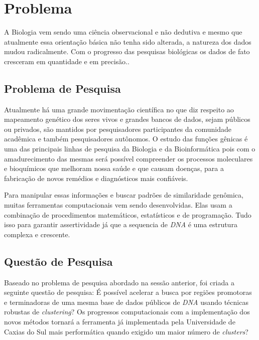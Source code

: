 \chapter{Problema}
\label{cap:PROBLEMA}

A Biologia vem sendo uma ciência observacional e não dedutiva e mesmo que atualmente essa orientação básica não tenha sido alterada, a natureza dos dados mudou radicalmente. Com o progresso das pesquisas biológicas os dados de fato cresceram em quantidade e em precisão.\cite{lesk2005introduction}.


\section{Problema de Pesquisa}

Atualmente há uma grande movimentação científica no que diz respeito ao mapeamento genético dos seres vivos e grandes bancos de dados, sejam públicos ou privados, são mantidos por pesquisadores participantes da comunidade acadêmica e também pesquisadores autônomos. O estudo das funções gênicas é uma das principais linhas de pesquisa da Biologia e da Bioinformática pois com o amadurecimento das mesmas será possível compreender os processos moleculares e bioquímicos que melhoram nossa saúde e que causam doenças, para a fabricação de novos remédios e diagnósticos mais confiáveis\cite{Murali2006}. 

Para manipular essas informações e buscar padrões de similaridade genômica, muitas ferramentas computacionais vem sendo desenvolvidas. Elas usam  a combinação de procedimentos matemáticos, estatísticos e de programação. Tudo isso para garantir assertividade já que a sequencia de \textit{DNA} é uma estrutura complexa e crescente.


\section{Questão de Pesquisa}
Baseado no problema de pesquisa abordado na sessão anterior, foi criada a seguinte questão de pesquisa: É possível acelerar a busca por regiões promotoras e terminadoras de uma mesma base de dados públicos de \textit{DNA} usando técnicas robustas de \textit{clustering}? Os progressos computacionais com a implementação dos novos métodos tornará a ferramenta já implementada pela Universidade de Caxias do Sul mais performática quando exigido um maior número de \textit{clusters}\cite{Basso:2015:UCS}\cite{Fontana:2013:UCS}? 
